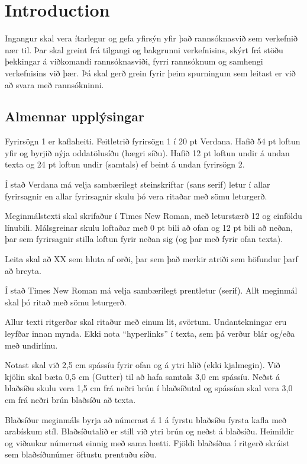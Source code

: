 \documentclass[a4paper,12pt,twoside,BCOR=10mm]{scrbook}
\begin{document}
\chapter{Introduction}
\setcounter{page}{1}
Ingangur skal vera ítarlegur og gefa yfirsýn yfir það rannsóknasvið sem verkefnið nær til. Þar skal greint frá tilgangi og bakgrunni verkefnisins, skýrt frá stöðu þekkingar á viðkomandi rannsóknasviði, fyrri rannsóknum og samhengi verkefnisins við þær. Þá skal gerð grein fyrir þeim spurningum sem leitast er við að svara með rannsókninni.

\section{Almennar upplýsingar}
Fyrirsögn 1 er kaflaheiti. Feitletrið fyrirsögn 1 í 20 pt Verdana. Hafið 54 pt loftun yfir og byrjið nýja oddatölusíðu (hægri síðu). Hafið 12 pt loftun undir á undan texta og 24 pt loftun undir (samtals) ef beint á undan fyrirsögn 2.

Í stað Verdana má velja sambærilegt steinskriftar (sans serif) letur í allar fyrirsagnir en allar fyrirsagnir skulu þó vera ritaðar með sömu leturgerð.

Meginmálstexti skal skrifaður í Times New Roman, með leturstærð 12 og einföldu línubili. Málsgreinar skulu loftaðar með 0 pt bili að ofan og 12 pt bili að neðan, þar sem fyrirsagnir stilla loftun fyrir neðan sig (og þar með fyrir ofan texta).

Leita skal að XX sem hluta af orði, þar sem það merkir atriði sem höfundur þarf að breyta.

Í stað Times New Roman má velja sambærilegt prentletur (serif). Allt meginmál skal þó ritað með sömu leturgerð. 

Allur texti ritgerðar skal ritaður með einum lit, svörtum. Undantekningar eru leyfðar innan mynda. Ekki nota “hyperlinks” í texta, sem þá verður blár og/eða með undirlínu.

Notast skal við 2,5 cm spássíu fyrir ofan og á ytri hlið (ekki kjalmegin). Við kjölin skal bæta 0,5 cm (Gutter) til að hafa samtals 3,0 cm spássíu. Neðst á blaðsíðu skulu vera 1,5 cm frá neðri brún í blaðsíðutal og spássían skal vera 3,0 cm frá neðri brún blaðsíðu að texta.

Blaðsíður meginmáls byrja að númerast á 1 á fyrstu blaðsíðu fyrsta kafla með arabískum stíl. Blaðsíðutalið er still við ytri brún og neðst á blaðsíðu. Heimildir og viðaukar númerast einnig með sama hætti. Fjöldi blaðsíðna í ritgerð skráist sem blaðsíðunúmer öftustu prentuðu síðu.
\end{document}
